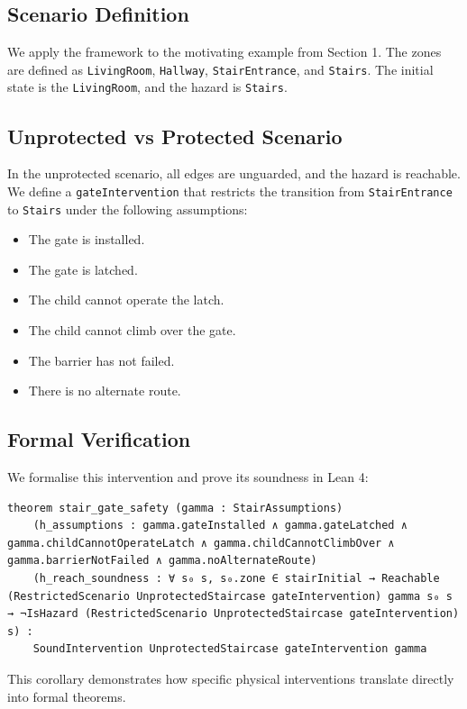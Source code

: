 \subsection{Scenario Definition}
We apply the framework to the motivating example from Section 1. The zones are defined as \texttt{LivingRoom}, \texttt{Hallway}, \texttt{StairEntrance}, and \texttt{Stairs}. The initial state is the \texttt{LivingRoom}, and the hazard is \texttt{Stairs}.

\subsection{Unprotected vs Protected Scenario}
In the unprotected scenario, all edges are unguarded, and the hazard is reachable. We define a \texttt{gateIntervention} that restricts the transition from \texttt{StairEntrance} to \texttt{Stairs} under the following assumptions:
\begin{itemize}
    \item The gate is installed.
    \item The gate is latched.
    \item The child cannot operate the latch.
    \item The child cannot climb over the gate.
    \item The barrier has not failed.
    \item There is no alternate route.
\end{itemize}

\subsection{Formal Verification}
We formalise this intervention and prove its soundness in Lean 4:
\begin{lstlisting}[language=Lean]
theorem stair_gate_safety (gamma : StairAssumptions)
    (h_assumptions : gamma.gateInstalled ∧ gamma.gateLatched ∧ gamma.childCannotOperateLatch ∧ gamma.childCannotClimbOver ∧ gamma.barrierNotFailed ∧ gamma.noAlternateRoute)
    (h_reach_soundness : ∀ s₀ s, s₀.zone ∈ stairInitial → Reachable (RestrictedScenario UnprotectedStaircase gateIntervention) gamma s₀ s → ¬IsHazard (RestrictedScenario UnprotectedStaircase gateIntervention) s) :
    SoundIntervention UnprotectedStaircase gateIntervention gamma
\end{lstlisting}
This corollary demonstrates how specific physical interventions translate directly into formal theorems.
